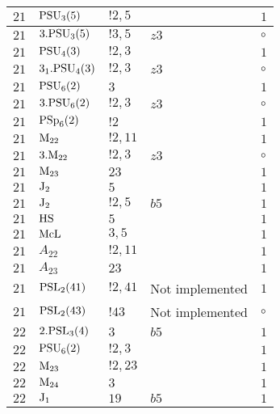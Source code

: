 \documentclass[a4paper, 11pt]{article}
\begin{document}
\begin{longtable}{lllll}
        $ 21 $ & $ {\rm PSU}_{3}(5) $ & $ ! 2,5 $ & $ ~ $ & $ 1$ \\ \hline
        $ 21 $ & $ 3.{\rm PSU}_{3}(5) $ & $ ! 3,5 $ & $ z3 $ &  $\circ$ \\ \hline
        $ 21 $ & $ {\rm PSU}_{4}(3) $ & $ ! 2,3 $ & $ ~ $ & $ 1$ \\ \hline
        $ 21 $ & $ 3_1.{\rm PSU}_{4}(3) $ & $ ! 2,3 $ & $ z3 $ &  $\circ$ \\ \hline
        $ 21 $ & $ {\rm PSU}_{6}(2) $ & $ 3 $ & $ ~ $ & $ 1$ \\ \hline
        $ 21 $ & $ 3.{\rm PSU}_{6}(2) $ & $ ! 2,3 $ & $ z3 $ &  $\circ$ \\ \hline
        $ 21 $ & $ {\rm PSp}_{6}(2) $ & $ ! 2 $ & $ ~ $ & $ 1$ \\ \hline
        $ 21 $ & $ {\rm M}_{22} $ & $ ! 2,11 $ & $ ~ $ & $ 1$ \\ \hline
        $ 21 $ & $ 3.{\rm M}_{22} $ & $ ! 2,3 $ & $ z3 $ &  $\circ$ \\ \hline
        $ 21 $ & $ {\rm M}_{23} $ & $ 23 $ & $ ~ $ & $ 1$ \\ \hline
        $ 21 $ & $ {\rm J}_2 $ & $ 5 $ & $ ~ $ & $ 1$ \\ \hline
        $ 21 $ & $ {\rm J}_2 $ & $ ! 2,5 $ & $ b5 $ & $ 1$ \\ \hline
        $ 21 $ & $ {\rm HS} $ & $ 5 $ & $ ~ $ & $ 1$ \\ \hline
        $ 21 $ & $ {\rm McL} $ & $ 3,5 $ & $ ~ $ & $ 1$ \\ \hline
        $ 21 $ & $ A_{22} $ & $ !2, 11 $ & $ ~ $ & $ 1$ \\ \hline
        $ 21 $ & $ A_{23} $ & $ 23 $ & $ ~ $ & $ 1$ \\ \hline
        $ 21 $ & $ {\rm PSL}_{2}(41) $ & $ !2, 41 $ &  Not implemented & $ 1$ \\ \hline
        $ 21 $ & $ {\rm PSL}_{2}(43) $ & $ !43 $ &  Not implemented &  $\circ$ \\ \hline
        $ 22 $ & $ 2.{\rm PSL}_{3}(4) $ & $ 3 $ & $ b5 $ & $ 1$ \\ \hline
        $ 22 $ & $ {\rm PSU}_{6}(2) $ & $ ! 2,3 $ & $ ~ $ & $ 1$ \\ \hline
        $ 22 $ & $ {\rm M}_{23} $ & $ ! 2,23 $ & $ ~ $ & $ 1$ \\ \hline
        $ 22 $ & $ {\rm M}_{24} $ & $ 3 $ & $ ~ $ & $ 1$ \\ \hline
        $ 22 $ & $ {\rm J}_1 $ & $ 19 $ & $ b5 $ & $ 1$ \\ \hline

\end{longtable}
\end{document}
